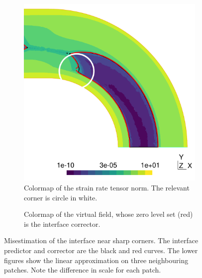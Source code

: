 \documentclass[11 pt]{report}
\begin{document}
\begin{figure}
    \centering
    \begin{subfigure}[t]{0.495\textwidth}
        \includegraphics[width=\textwidth]{../figures/corner_5.pdf}
        \caption{Colormap of the strain rate tensor norm. The relevant corner is circle in white.}
    \end{subfigure}
    \begin{subfigure}[t]{0.495\textwidth}
        
        \caption{Colormap of the virtual field, whose zero level set (red) is the interface corrector.}
    \end{subfigure}\vspace{6pt}
    \begin{subfigure}[t]{0.325\textwidth}
        
    \end{subfigure}
    \begin{subfigure}[t]{0.325\textwidth}
        
    \end{subfigure}
    \begin{subfigure}[t]{0.325\textwidth}
        
    \end{subfigure}\vspace{6pt}
    \caption{Misestimation of the interface near sharp corners. The interface predictor and corrector are the black and red curves. The lower figures show the linear approximation on three neighbouring patches. Note the difference in scale for each patch.}
    \label{fig:failureCorner}
\end{figure}
\end{document}
